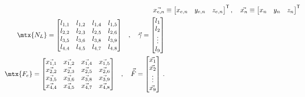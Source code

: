 \documentclass[11pt]{iopart}
\begin{document}
\begin{subequations}
    \begin{align}
        \vec{x_{e,n}} & \equiv	\begin{bmatrix}
            x_{e,n} & y_{e,n} & z_{e,n}
        \end{bmatrix}^{\mathsf{T}}, \quad
        \vec{x_{n}} \equiv	\begin{bmatrix}
            x_{n} & y_{n} & z_{n}
        \end{bmatrix}^{\mathsf{T}}            \\
        \begin{split}
            \mtx{N_{L}} &=	\begin{bmatrix}
                l_{1,1} & l_{1,2} & l_{1,4} & l_{1,5} \\
                l_{2,2} & l_{2,3} & l_{2,5} & l_{2,6} \\
                l_{3,5} & l_{3,6} & l_{3,8} & l_{3,9} \\
                l_{4,4} & l_{4,5} & l_{4,7} & l_{4,8} \\
            \end{bmatrix}
        \end{split}
        , \quad
        \vec{\gamma} =   \begin{bmatrix}
            l_1    \\
            l_2    \\
            \vdots \\
            l_9
        \end{bmatrix}                          \\
        \begin{split}
            \mtx{F_{e}} &=	\begin{bmatrix}
                \vec{x_{1,1}} & \vec{x_{1,2}} & \vec{x_{1,4}} & \vec{x_{1,5}} \\
                \vec{x_{2,2}} & \vec{x_{2,3}} & \vec{x_{2,5}} & \vec{x_{2,6}} \\
                \vec{x_{3,5}} & \vec{x_{3,6}} & \vec{x_{3,8}} & \vec{x_{3,9}} \\
                \vec{x_{4,4}} & \vec{x_{4,5}} & \vec{x_{4,7}} & \vec{x_{4,8}} \\
            \end{bmatrix}
        \end{split}
        ,\quad
        \vec{\tilde{F}} = 	\begin{bmatrix}
            \vec{x_{1}} \\
            \vec{x_{2}} \\
            \vdots      \\
            \vec{x_{9}}
        \end{bmatrix}\,.\label{eq:force_imp}
    \end{align}
\end{subequations}
\end{document}
